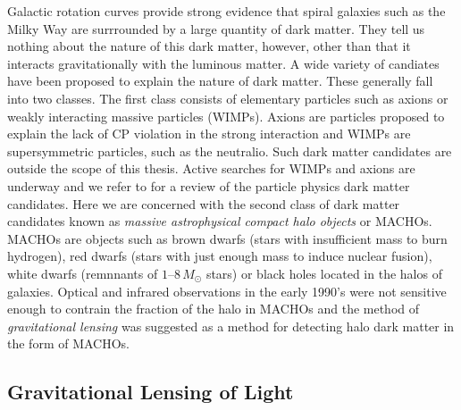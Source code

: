 Galactic rotation curves provide strong evidence that spiral galaxies such
as the Milky Way are surrrounded by a large quantity of dark matter. They
tell us nothing about the nature of this dark matter, however, other than that
it interacts gravitationally with the luminous matter. A wide variety of
candiates have been proposed to explain the nature of dark matter. These
generally fall into two classes. The first class consists of elementary
particles such as axions\cite{Weinberg:1977ma} or weakly interacting massive
particles (WIMPs)\cite{Goodman:1984dc}. Axions are particles proposed to
explain the lack of CP violation in the strong interaction and WIMPs are
supersymmetric particles, such as the neutralio. Such dark matter candidates
are outside the scope of this thesis. Active searches for WIMPs and axions are
underway and we refer to \cite{Griest:1995gs} for a review of the particle
physics dark matter candidates.  Here we are concerned with the second class
of dark matter candidates known as \emph{massive astrophysical compact halo
objects} or MACHOs.  MACHOs are objects such as brown dwarfs (stars with
insufficient mass to burn hydrogen), red dwarfs (stars with just enough mass
to induce nuclear fusion), white dwarfs (remnnants of $1$--$8\,M_\odot$ stars)
or black holes located in the halos of galaxies.  Optical and infrared
observations in the early 1990's were not sensitive enough to contrain the
fraction of the halo in MACHOs\cite{1994MNRAS.266..775K} and the method of
\emph{gravitational lensing} was suggested\cite{Paczynski:1985jf} as a method
for detecting halo dark matter in the form of MACHOs.

\subsection{Gravitational Lensing of Light}
\label{ss:microlensing}

